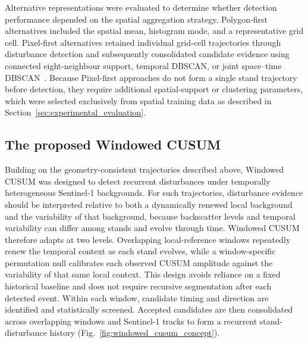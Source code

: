 Alternative representations were evaluated to determine whether detection performance depended on the spatial aggregation strategy. Polygon-first alternatives included the spatial mean, histogram mode, and a representative grid cell. Pixel-first alternatives retained individual grid-cell trajectories through disturbance detection and subsequently consolidated candidate evidence using connected eight-neighbour support, temporal DBSCAN, or joint space--time DBSCAN~\citep{Ester1996DBSCAN}. Because Pixel-first approaches do not form a single stand trajectory before detection, they require additional spatial-support or clustering parameters, which were selected exclusively from spatial training data as described in Section~\ref{sec:experimental_evaluation}. 



\subsection{The proposed Windowed CUSUM}
\label{sec:windowed_cusum}


Building on the geometry-consistent trajectories described above, Windowed CUSUM was designed to detect recurrent disturbances under temporally heterogeneous Sentinel-1 backgrounds. For such trajectories, disturbance evidence should be interpreted relative to both a dynamically renewed local background and the variability of that background, because backscatter levels and temporal variability can differ among stands and evolve through time. Windowed CUSUM therefore adapts at two levels. Overlapping local-reference windows repeatedly renew the temporal context as each stand evolves, while a window-specific permutation null calibrates each observed CUSUM amplitude against the variability of that same local context. This design avoids reliance on a fixed historical baseline and does not require recursive segmentation after each detected event. Within each window, candidate timing and direction are identified and statistically screened. Accepted candidates are then consolidated across overlapping windows and Sentinel-1 tracks to form a recurrent stand-disturbance history (Fig.~\ref{fig:windowed_cusum_concept}).


